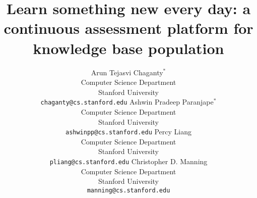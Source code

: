 \documentclass[11pt]{article}
\title{Learn something new every day: a continuous assessment platform for knowledge base population}
\author{%
  Arun Tejasvi Chaganty$^*$ \\
  Computer Science Department \\
  Stanford University \\
  {\tt chaganty@cs.stanford.edu}
\And%
  Ashwin Pradeep Paranjape$^*$ \\
  Computer Science Department \\
  Stanford University \\
  {\tt ashwinpp@cs.stanford.edu}
\And%
  Percy Liang \\
  Computer Science Department \\
  Stanford University \\
  {\tt pliang@cs.stanford.edu}
\And%
  Christopher D. Manning \\
  Computer Science Department \\
  Stanford University \\
  {\tt manning@cs.stanford.edu}
}
\date{}
\begin{document}
\maketitle

\begin{abstract}

\end{abstract}













\appendix

\end{document}
